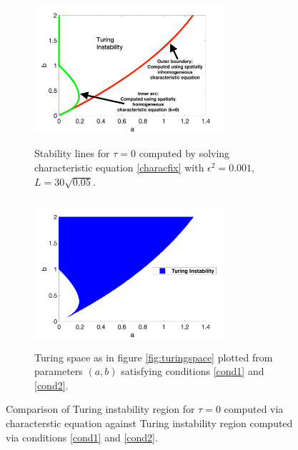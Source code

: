 \begin{figure}[H]
    \centering
    \begin{subfigure}[b]{0.47\textwidth}
        \centering
        \includegraphics[width=7cm,height = 5.5cm]{bif0.png}
        \caption{Stability lines for $\tau=0$ computed by solving characteristic equation \eqref{characfix} with $\epsilon^2=0.001$, $L=30\sqrt{0.05}$.}
        \label{fig:bif0}
    \end{subfigure}
    \hfill
    \begin{subfigure}[b]{0.47\textwidth}
        \centering
        \includegraphics[width=7cm,height = 5.5cm]{turingspace.png}
        \caption{Turing space as in figure \ref{fig:turingspace} plotted from parameters $(a,b)$ satisfying conditions \eqref{cond1} and \eqref{cond2}.}
        \label{}
    \end{subfigure}
    \caption{Comparison of Turing instability region for $\tau=0$ computed via characterstic equation against Turing instability region computed via conditions \eqref{cond1} and \eqref{cond2}.}
    \label{fig:tspace1}
\end{figure}

